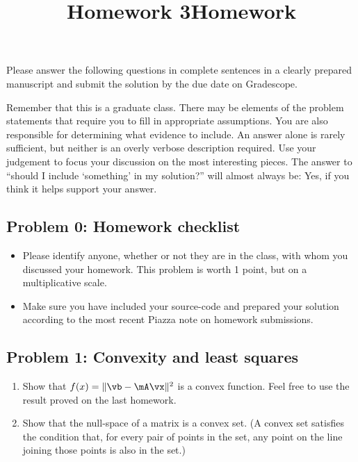 \documentclass[]{article}
\title{Homework 3}
\title{Homework}
\begin{document}
\maketitle

Please answer the following questions in complete sentences in a clearly
prepared manuscript and submit the solution by the due date on
Gradescope.

Remember that this is a graduate class. There may be elements of the
problem statements that require you to fill in appropriate assumptions.
You are also responsible for determining what evidence to include. An
answer alone is rarely sufficient, but neither is an overly verbose
description required. Use your judgement to focus your discussion on the
most interesting pieces. The answer to ``should I include `something' in
my solution?'' will almost always be: Yes, if you think it helps support
your answer.

\hypertarget{problem-0-homework-checklist}{%
\subsection{Problem 0: Homework
checklist}\label{problem-0-homework-checklist}}

\begin{itemize}
\item
  Please identify anyone, whether or not they are in the class, with
  whom you discussed your homework. This problem is worth 1 point, but
  on a multiplicative scale.
\item
  Make sure you have included your source-code and prepared your
  solution according to the most recent Piazza note on homework
  submissions.
\end{itemize}

\hypertarget{problem-1-convexity-and-least-squares}{%
\subsection{Problem 1: Convexity and least
squares}\label{problem-1-convexity-and-least-squares}}

\begin{enumerate}
\def\labelenumi{\arabic{enumi}.}
\item
  Show that \(f(x) = \| \vb - \mA \vx \|^2\) is a convex function. Feel
  free to use the result proved on the last homework.
\item
  Show that the null-space of a matrix is a convex set. (A convex set
  satisfies the condition that, for every pair of points in the set, any
  point on the line joining those points is also in the set.)
\end{enumerate}
\end{document}

